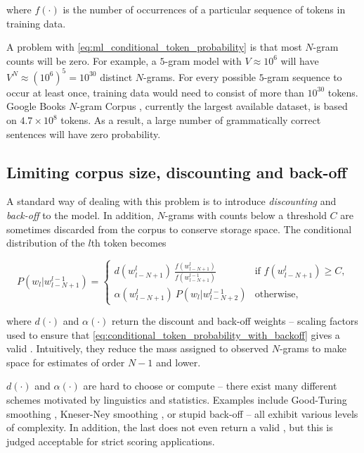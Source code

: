 \documentclass[draft]{IIBproject}
\makeatletter
\DeclareRobustCommand*{\AbbreviationWithDot}[1]{\@ifnextchar{.}{#1}{#1.\@\xspace}}
\DeclareRobustCommand*{\pmf}{\AbbreviationWithDot{p.m.f}}
\makeatother
\begin{document}
where $f(\cdot)$ is the number of occurrences of a particular sequence of tokens in training data.

A problem with \cref{eq:ml_conditional_token_probability} is that most $N$-gram counts will be zero. For example, a $5$-gram model with $V \approx 10^6$ will have $V^N \approx \left( 10^6 \right)^5 = 10^{30}$ distinct $N$-grams. For every possible $5$-gram sequence to occur at least once, training data would need to consist of more than $10^{30}$ tokens. Google Books $N$-gram Corpus \cite{googlengrams2011}, currently the largest available dataset, is based on $4.7 \times 10^{8}$ tokens. As a result, a large number of grammatically correct sentences will have zero probability.

\FloatBarrier
\subsection{Limiting corpus size, discounting and back-off}

A standard way of dealing with this problem is to introduce \emph{discounting} and \emph{back-off} to the model. In addition, $N$-grams with counts below a threshold $C$ are sometimes discarded from the corpus to conserve storage space. The conditional distribution of the $l$th token becomes

\begin{equation}
	\label{eq:conditional_token_probability_with_backoff}
	P( w_l | w_{l-N+1}^{l-1} ) =
	\begin{cases}
		d (w_{l-N+1}^l) ~ \frac {f\left(w_{l-N+1}^l \right)} {f\left(w_{l-N+1}^{l-1} \right)} & \text{if $f(w_{l-N+1}^l) \ge C$},\\
		\alpha (w_{l-N+1}^l) ~ P( w_l | w_{l-N+2}^{l-1} ) & \text{otherwise},
	\end{cases}
\end{equation}

where $d(\cdot)$ and $\alpha(\cdot)$ return the discount and back-off weights -- scaling factors used to ensure that \cref{eq:conditional_token_probability_with_backoff} gives a valid \pmf. Intuitively, they reduce the mass assigned to observed $N$-grams to make space for estimates of order $N{-}1$ and lower.

$d(\cdot)$ and $\alpha(\cdot)$ are hard to choose or compute -- there exist many different schemes motivated by linguistics and statistics. Examples include Good-Turing smoothing \cite{good1953}, Kneser-Ney smoothing \cite{kneserney1995}, or stupid back-off \cite{brants2007} -- all exhibit various levels of complexity. In addition, the last does not even return a valid \pmf, but this is judged acceptable for strict scoring applications.
\end{document}
